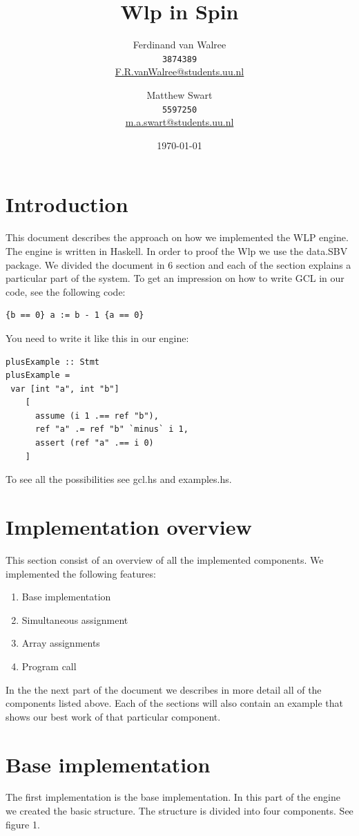\documentclass{article}
\title{Wlp in Spin}
\author{
Ferdinand van Walree\\
\texttt{3874389}\\
\href{mailto:F.R.vanWalree@students.uu.nl}{F.R.vanWalree@students.uu.nl}
\and
Matthew Swart\\
\texttt{5597250}\\
\href{mailto:m.a.swart@students.uu.nl}{m.a.swart@students.uu.nl}
}
\date{\today}
\begin{document}
\maketitle


\section{Introduction}
This document describes the approach on how we implemented the WLP engine. The engine is written in Haskell. In order to proof the Wlp we use the data.SBV package. We divided the document in 6 section and each of the section explains a particular part of the system. 
To get an impression on how to write GCL in our code, see the following code:
\begin{lstlisting}
{b == 0} a := b - 1 {a == 0}
\end{lstlisting}
 You need to write it like this in our engine:
\begin{lstlisting}
plusExample :: Stmt
plusExample = 
 var [int "a", int "b"]
    [
      assume (i 1 .== ref "b"),
      ref "a" .= ref "b" `minus` i 1,
      assert (ref "a" .== i 0)
    ]
\end{lstlisting}

To see all the possibilities see gcl.hs and examples.hs.

\section{Implementation overview}
This section consist of an overview of all the implemented components. We implemented the following features:
\begin{enumerate}
\item{Base implementation}
\item{Simultaneous assignment}
\item{Array assignments}
\item{Program call}
\end{enumerate}

In the the next part of the document we describes in more detail all of the components listed above. Each of the sections will also contain an example that shows our best work of that particular component. 

\section{Base implementation}
The first implementation is the base implementation. In this part of the engine we created the basic structure. The structure is divided into four components. See figure 1.
\end{document}
